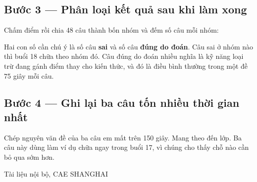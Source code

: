 \documentclass[11pt, a4paper]{article}
\begin{document}
\subsection{Bước 3 — Phân loại kết quả sau khi làm xong}

Chấm điểm rồi chia 48 câu thành bốn nhóm và đếm số câu mỗi nhóm:


Hai con số cần chú ý là số câu \textbf{sai} và số câu \textbf{đúng do đoán}. Câu sai ở nhóm nào thì buổi 18 chữa theo nhóm đó. Câu đúng do đoán nhiều nghĩa là kỹ năng loại trừ đang gánh điểm thay cho kiến thức, và đó là điều bình thường trong một đề 75 giây mỗi câu.

\subsection{Bước 4 — Ghi lại ba câu tốn nhiều thời gian nhất}

Chép nguyên văn đề của ba câu em mất trên 150 giây. Mang theo đến lớp. Ba câu này dùng làm ví dụ chữa ngay trong buổi 17, vì chúng cho thấy chỗ nào cần bỏ qua sớm hơn.
\vspace{0.8cm}
\begin{center}
{\footnotesize\color{cae_blue} Tài liệu nội bộ, CAE SHANGHAI}
\end{center}
\end{document}
